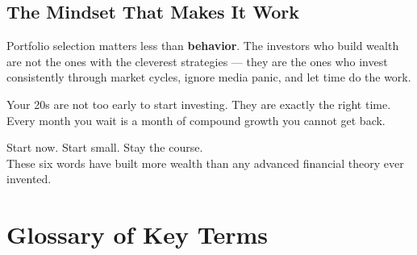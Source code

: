 \documentclass[12pt, a4paper]{book}
\begin{document}
\section{The Mindset That Makes It Work}

Portfolio selection matters less than \textbf{behavior}. The investors who build wealth are not the ones with the cleverest strategies --- they are the ones who invest consistently through market cycles, ignore media panic, and let time do the work.

Your 20s are not too early to start investing. They are exactly the right time. Every month you wait is a month of compound growth you cannot get back.

\begin{tipbox}
Start now. Start small. Stay the course.\\[4pt]
These six words have built more wealth than any advanced financial theory ever invented.
\end{tipbox}

\chapter*{Glossary of Key Terms}
\end{document}
